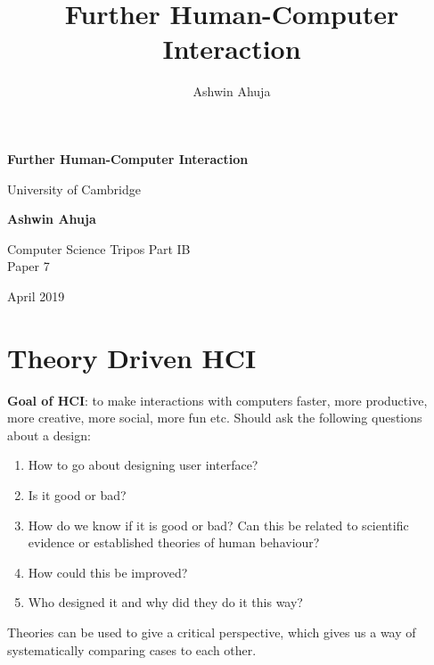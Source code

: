 \documentclass{article}
\title{Further Human-Computer Interaction}
\author{Ashwin Ahuja}
\begin{document}
\makeatletter
\renewcommand{\l@subsection}{\@dottedtocline{2}{1.6em}{2.6em}}
\makeatother

\begin{titlepage}
\begin{center}
			\vspace*{1cm}
			
			\Huge
			\textbf{Further Human-Computer Interaction}
			
			\vspace{0.5cm}
			\LARGE
			University of Cambridge
			
			\vspace{1.5cm}
			
			\textbf{Ashwin Ahuja}
			
			\vfill
			
			Computer Science Tripos Part IB\\
			Paper 7
			
			\vspace{5cm}
			
			April 2019
			
\end{center}
\end{titlepage}

\tableofcontents
\pagebreak

\section{Theory Driven HCI}
\textbf{Goal of HCI}: to make interactions with computers faster, more productive, more creative, more social, more fun etc. Should ask the following questions about a design:
\begin{enumerate}
    \item How to go about designing user interface?
    \item Is it good or bad?
    \item How do we know if it is good or bad? Can this be related to scientific evidence or established theories of human behaviour?
    \item How could this be improved?
    \item Who designed it and why did they do it this way?
\end{enumerate}

Theories can be used to give a critical perspective, which gives us a way of systematically comparing cases to each other.
\end{document}
